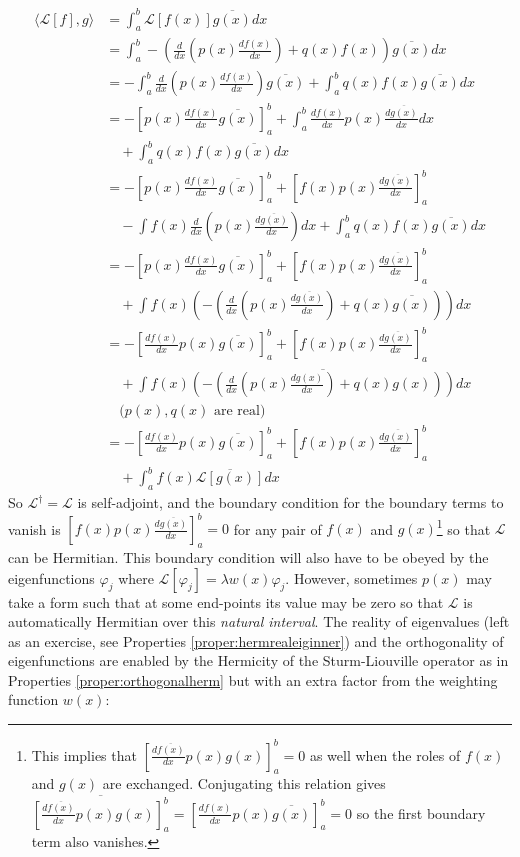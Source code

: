 \begin{align*}
\langle \mathcal{L}[f], g \rangle &= \int_a^b \mathcal{L}[f(x)] \overline{g(x)} dx \\
&= \int_a^b -\left(\frac{d}{dx} (p(x) \frac{df(x)}{dx}) + q(x)f(x)\right)  \overline{g(x)} dx \\
&= -\int_a^b \frac{d}{dx} (p(x) \frac{d f(x)}{dx}) \overline{g(x)} + \int_a^b q(x)f(x)\overline{g(x)} dx \\
&= -[p(x) \frac{df(x)}{dx} \overline{g(x)}]_a^b + \int_a^b \frac{df(x)}{dx} p(x) \frac{d\overline{g(x)}}{dx} dx \\
&\quad + \int_a^b q(x)f(x)\overline{g(x)} dx\\
&= -[p(x) \frac{df(x)}{dx} \overline{g(x)}]_a^b + [f(x) p(x) \frac{d\overline{g(x)}}{dx}]_a^b  \\
&\quad -\int f(x)\frac{d}{dx}(p(x) \frac{d\overline{g(x)}}{dx}) dx + \int_a^b q(x)f(x)\overline{g(x)} dx \\
&= -[p(x) \frac{df(x)}{dx} \overline{g(x)}]_a^b + [f(x) p(x) \frac{d\overline{g(x)}}{dx}]_a^b  \\
&\quad + \int f(x) \left(-(\frac{d}{dx}(p(x) \frac{d\overline{g(x)}}{dx}) + q(x)\overline{g(x)})\right) dx \\
&= -[\frac{df(x)}{dx} p(x) \overline{g(x)}]_a^b + [f(x) p(x) \frac{d\overline{g(x)}}{dx}]_a^b \\
&\quad + \int f(x) \overline{\left(-(\frac{d}{dx}(p(x) \frac{d g(x)}{dx}) + q(x)g(x))\right)} dx \\
&\quad \text{($p(x), q(x)$ are real)} \\
&= -[\frac{df(x)}{dx} p(x) \overline{g(x)}]_a^b + [f(x) p(x) \frac{d\overline{g(x)}}{dx}]_a^b \\
&\quad + \int_a^b f(x) \overline{\mathcal{L}[g(x)]} dx
\end{align*}
So $\mathcal{L}^\dag = \mathcal{L}$ is self-adjoint, and the boundary condition for the boundary terms to vanish is $[f(x) p(x) \frac{d\overline{g(x)}}{dx}]_a^b = 0$ for any pair of $f(x)$ and $g(x)$\footnote{This implies that $[\frac{d\overline{f(x)}}{dx} p(x) g(x)]_a^b = 0$ as well when the roles of $f(x)$ and $g(x)$ are exchanged. Conjugating this relation gives $\overline{[\frac{d\overline{f(x)}}{dx} p(x) g(x)]_a^b} = [\frac{df(x)}{dx} p(x) \overline{g(x)}]_a^b = 0$ so the first boundary term also vanishes.} so that $\mathcal{L}$ can be Hermitian. This boundary condition will also have to be obeyed by the eigenfunctions $\varphi_j$ where $\mathcal{L}[\varphi_j] = \lambda w(x)\varphi_j$. However, sometimes $p(x)$ may take a form such that at some end-points its value may be zero so that $\mathcal{L}$ is automatically Hermitian over this \textit{natural interval}. The reality of eigenvalues (left as an exercise, see Properties \ref{proper:hermrealeiginner}) and the orthogonality of eigenfunctions are enabled by the Hermicity of the Sturm-Liouville operator as in Properties \ref{proper:orthogonalherm} but with an extra factor from the weighting function $w(x)$:
